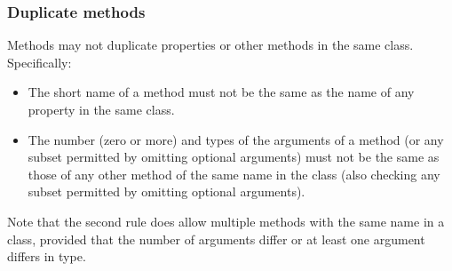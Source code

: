 \subsubsection{Duplicate methods}
 
Methods may not duplicate properties or other methods in the same class.
Specifically:
\begin{itemize}
\item 
The short name of a method must not be the same as the name of any
property in the same class.
\item 
The number (zero or more) and types of the arguments of a method (or any
subset permitted by omitting optional arguments) must not be the same as
those of any other method of the same name in the class (also checking
any subset permitted by omitting optional arguments).
\end{itemize}
Note that the second rule does allow multiple methods with the same
name in a class, provided that the number of arguments differ or
at least one argument differs in type.
\index{,}
